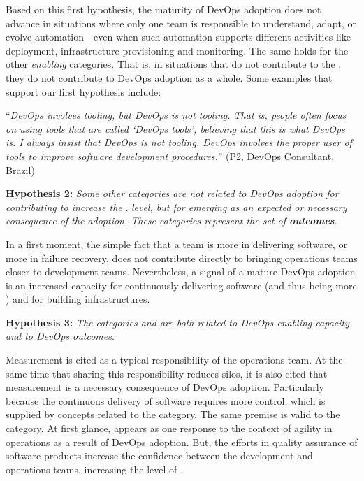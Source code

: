 Based on this first hypothesis, the maturity of DevOps adoption does not
advance in situations where only one team is responsible to understand, adapt, or
evolve automation---even when such automation supports different activities like
deployment, infrastructure provisioning and monitoring. The same holds for the
other \emph{enabling} categories. That is, in situations that
 do not contribute to
the \cc, they do not contribute to DevOps adoption as a whole. Some examples
that support our first hypothesis include:

\begin{mq}
``\emph{DevOps involves tooling, but DevOps is not tooling. That is, people often
focus on using tools that are called `DevOps tools', believing that this is
what DevOps is. I always insist that DevOps is not tooling, DevOps involves the
proper user of tools to improve software development procedures.}'' (P2, DevOps
Consultant, Brazil)
\end{mq}

\begin{mh}
\textbf{Hypothesis 2:} \textit{Some other categories are not related to DevOps
adoption for contributing to increase the} \cc. \emph{level, but for emerging
as an expected or necessary consequence of the adoption. These categories
represent the set of \textbf{outcomes}}.
\end{mh}

In a first moment, the simple fact that a team is more
 in delivering software, or more  in failure recovery, does not
contribute directly to bringing operations teams closer to development teams.
Nevertheless, a signal of a mature DevOps adoption is an increased capacity for continuously
delivering software (and thus being more )
and for building  infrastructures.

\begin{mh}
\textbf{Hypothesis 3:} \textit{The categories  and 
are both related to DevOps enabling capacity and to DevOps outcomes}.
\end{mh}

Measurement is cited as a typical responsibility of the operations team.
At the same time that sharing this responsibility reduces silos,
it is also cited that measurement is a necessary consequence of DevOps adoption. Particularly because
the continuous delivery of software requires more control,
which is supplied by concepts related to the  category.
The same premise is valid to the  category. At first glance,
 appears as one response to the context of agility in operations
as a result of DevOps adoption. But, the efforts in quality assurance of software products
increase the confidence between the development and operations teams, increasing the level
of \cc.

